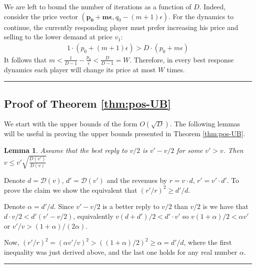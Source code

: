 \documentclass[11pt,a4paper]{article}
\newcommand{\qed}{\rule{1.5mm}{2mm}\vspace{0.1in}}
\newenvironment{proof}{\par\noindent{\bf Proof:}}{\qed}
\newcommand{\D}{\mathcal{D}}
\newtheorem{lemma}[theorem]{Lemma}
\begin{document}
\begin{proof}
	We are left to bound the number of iterations as a function of $D$.
	Indeed, consider the price vector $(\pmb{p_0+m\epsilon},q_0-(m+1)\epsilon)$.
	For the dynamics to continue, the currently responding player must prefer
	increasing his price and selling to the lower demand at price $v_1$:
	\begin{align}
	1\cdot(p_0+(m+1)\epsilon) > D\cdot(p_0+m\epsilon)
	\end{align}
	It follows that $m<\frac{1}{D-1}-\frac{p_0}{\epsilon}<\frac{D}{D-1}=W$. Therefore, in every best response dynamics each player will change its price at most $W$ times.
\end{proof}



\subsection{Proof of Theorem \ref{thm:pos-UB}}
\label{sec:proof-pos-ub}

We start with the upper bounds of the form $O(\sqrt{D})$.
The following lemmas will be useful in proving the upper bounds presented in Theorem \ref{thm:pos-UB}.
\begin{lemma}\label{lem-sqrt-bound}
	Assume that the best reply
	to $v/2$ is $v'-v/2$ for some $v'>v$.
	Then $v\leq v' \sqrt{\frac{D(v')}{D(v)}}$
\end{lemma}
\begin{proof}
 Denote $d = \D(v)$, $d'=\D(v')$ and the revenues by $r=v\cdot d$, $r'=v'\cdot d'$.
 To prove the claim we show the equivalent that $(r'/r)^2 \ge d'/d$.
	
	Denote $\alpha = d'/d$.  Since $v'-v/2$ is a better reply to $v/2$ than
	$v/2$ is we have that $d\cdot v/2 < d' (v'-v/2)$, equivalently
	$v(d+d')/2 < d'\cdot v'$ so $v(1+\alpha)/2 < \alpha v'$ or
	$v'/v > (1+\alpha)/(2\alpha)$.
	
	Now, $(r'/r)^2= (\alpha v'/v)^2 >
	((1+\alpha)/2)^2 \ge \alpha = d'/d$, where the first inequality was
	just derived above, and the last one holds for any real number $\alpha$.
\end{proof}
\end{document}

